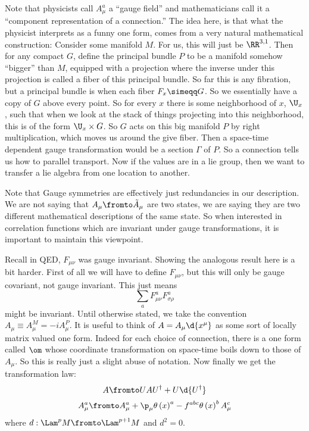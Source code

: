 \documentclass{booc}
\begin{document}
Note that physicists call $A_\mu^a$ a ``gauge field''
and mathematicians call it a ``component representation of a
connection.''
The idea here, is that what the physicist interprets as a funny one form, 
comes from a very natural mathematical construction:
Consider some manifold $M$.
For us, this will just be $\RR^{3 , 1}$.
Then for any compact $G$, 
define the principal bundle $P$ to be a manifold somehow ``bigger'' than $M$, 
equipped with a projection where the inverse under this projection 
is called a fiber of this principal bundle. 
So far this is any fibration, but a principal bundle is when
each fiber $F_x \simeqq G$. 
So we essentially have a copy of $G$ above every point.
So for every $x$ there is some neighborhood of $x$, $\U_x$, 
such that when we look at the stack of things projecting into this neighborhood,
this is of the form $\U_x\times G$.
So $G$ acts on this big manifold $P$ by right multiplication, which moves us around the 
give fiber. 
Then a space-time dependent gauge transformation would be a section $\Gamma$ of $P$. 
So a connection tells us how to parallel transport. 
Now if the values are in a lie group, then we want to transfer a lie algebra from one location
to another. 

Note that Gauge symmetries are effectively just redundancies in our description. 
We are not saying that $A_\mu \fromto \tilde A_\mu$ are two states, 
we are saying they are two different mathematical descriptions
of the same state. 
So when interested in correlation functions which are invariant under gauge transformations,
it is important to maintain this viewpoint.

Recall in QED, $F_{\mu\nu}$ was gauge invariant. 
Showing the analogous result here is a bit harder.
First of all we will have to define $F_{\mu\nu}$, 
but this will only be gauge covariant, not gauge invariant. 
This just means
\begin{equation}
\sum_a F_{\mu\nu}^a F_{\sigma \rho}^a
\end{equation}
might be invariant.
Until otherwise stated, we take the convention
$A_\mu \equiv A_\mu^M = -i A_\mu^P$. 
It is useful to think of
$A = A_\mu \d{x^\mu}$ as some sort of locally matrix valued one form.
Indeed for each choice of connection, there is a one form called $\om$
whose coordinate transformation on space-time boils down to those of $A_\mu$.
So this is really just a slight abuse of notation.
Now finally we get the transformation law:
\begin{equation}
A \fromto UAU^\dag + U\d{U^\dag}
\end{equation}
\begin{equation}
A_\mu^a \fromto
A_\mu^a 
+ \p_\mu \theta\left( x \right)^a 
- f^{abc} \theta\left( x \right)^b A_\mu^c
\end{equation}
where
$d: \Lam^p M \fromto \Lam^{p+1}M$
and $d^2 = 0$.
\end{document}
